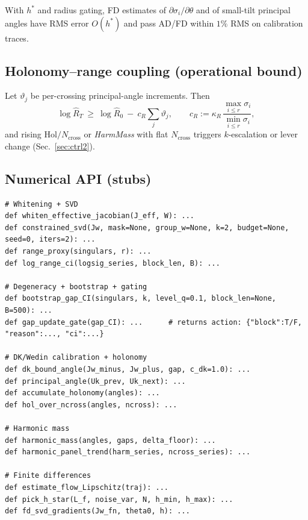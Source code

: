\begin{proposition}\label{prop:svdgrads}
\emph{}
With $h^\ast$ and radius gating, FD estimates of $\partial \sigma_i/\partial \theta$ and of small-tilt principal angles have RMS error $O(h^\ast)$ and pass AD/FD within $1\%$ RMS on calibration traces.
\end{proposition}

\subsection*{Holonomy–range coupling (operational bound)}
Let $\vartheta_j$ be per-crossing principal-angle increments. Then
\[
\log \widehat R_T \ \ge\ \log \widehat R_0 \ -\ c_R \sum_j \vartheta_j,
\qquad
c_R:=\kappa_R\,\frac{\max_{i\le r}\sigma_i}{\min_{i\le r}\sigma_i},
\]
and rising $\mathrm{Hol}/N_{\mathrm{cross}}$ or \emph{HarmMass} with flat $N_{\mathrm{cross}}$ triggers $k$-escalation or lever change (Sec.~\ref{sec:ctrl2}).

\subsection*{Numerical API (stubs)}
\begin{lstlisting}
# Whitening + SVD
def whiten_effective_jacobian(J_eff, W): ...
def constrained_svd(Jw, mask=None, group_w=None, k=2, budget=None, seed=0, iters=2): ...
def range_proxy(singulars, r): ...
def log_range_ci(logsig_series, block_len, B): ...

# Degeneracy + bootstrap + gating
def bootstrap_gap_CI(singulars, k, level_q=0.1, block_len=None, B=500): ...
def gap_update_gate(gap_CI): ...      # returns action: {"block":T/F, "reason":..., "ci":...}

# DK/Wedin calibration + holonomy
def dk_bound_angle(Jw_minus, Jw_plus, gap, c_dk=1.0): ...
def principal_angle(Uk_prev, Uk_next): ...
def accumulate_holonomy(angles): ...
def hol_over_ncross(angles, ncross): ...

# Harmonic mass
def harmonic_mass(angles, gaps, delta_floor): ...
def harmonic_panel_trend(harm_series, ncross_series): ...

# Finite differences
def estimate_flow_Lipschitz(traj): ...
def pick_h_star(L_f, noise_var, N, h_min, h_max): ...
def fd_svd_gradients(Jw_fn, theta0, h): ...
\end{lstlisting}

